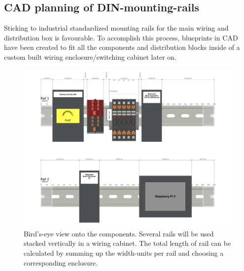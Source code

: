     \clearpage %

    \subsection{CAD planning of DIN-mounting-rails}

    Sticking to industrial standardized mounting rails for the main wiring and distribution box is favourable. To accomplish this process, blueprints in CAD have been created to fit all the components and distribution blocks inside of a custom built wiring enclosure/switching cabinet later on. 

    \begin{figure}[h!] %
        \centering
        \includegraphics[width=1\linewidth]{contents/figures/bird-view_rails.png}
        \caption{Bird's-eye view onto the components. Several rails will be used stacked vertically in a wiring cabinet. The total length of rail can be calculated by summing up the width-units per rail and choosing a corresponding enclosure.}
        \label{bird-cad}
    \end{figure}

    \clearpage %

